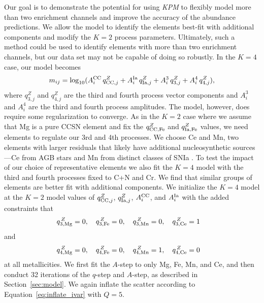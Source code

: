 \documentclass[modern, linenumbers]{aastex631}
\newcommand{\qcc}{q_{{\rm CC,}j}^{Z}}
\newcommand{\qccFe}{q_{{\rm CC, Fe}}^{Z}}
\newcommand{\qIa}{q_{{\rm Ia,}j}^{Z}}
\newcommand{\qIaFe}{q_{{\rm Ia,Fe}}^{Z}}
\newcommand{\Acc}{A^{\rm CC}_{i}}
\newcommand{\AIa}{A^{\rm Ia}_{i}}
\newcommand{\name}{\textsl{KPM}}
\begin{document}
Our goal is to demonstrate the potential for using \name{} to flexibly model more than two enrichment channels and improve the accuracy of the abundance predictions. We allow the model to identify the elements best-fit with additional components and modify the $K=2$ process parameters. Ultimately, such a method could be used to identify elements with more than two enrichment channels, but our data set may not be capable of doing so robustly. In the $K=4$ case, our model becomes
\begin{equation}\label{eq:mij_4}
    m_{ij} = \log_{10}(\Acc\,\qcc + \AIa\,\qIa + A_{i}^{3}\,q_{3, j}^{Z} + A_{i}^{4}\,q_{4, j}^{Z}),
\end{equation}
where $q_{3, j}^{Z}$ and $q_{4, j}^{Z}$ are the third and fourth process vector components and $ A_{i}^3$ and $A_{i}^4$ are the third and fourth process amplitudes. The model, however, does require some regularization to converge. As in the $K=2$ case where we assume that Mg is a pure CCSN element and fix the $\qccFe$ and $\qIaFe$ values, we need elements to regulate our 3rd and 4th processes. We choose Ce and Mn, two elements with larger residuals that likely have additional nucleosynthetic sources---Ce from AGB stars and Mn from distinct classes of SNIa \citep[e.g.][]{gallino1998, reyes2020, gronow2021}. To test the impact of our choice of representative elements we also fit the $K=4$ model with the third and fourth processes fixed to C+N and Cr. We find that similar groups of elements are better fit with additional components. We initialize the $K=4$ model at the $K=2$ model values of $\qcc$, $\qIa$, $\Acc$, and $\AIa$ with the added constraints that 
\begin{equation}\label{eq:q3_z}
    q_{{\rm 3, Mg}}^{\,Z} = 0, \quad 
    q_{{\rm 3, Fe}}^{\,Z} = 0,  \quad 
    q_{{\rm 3, Mn}}^{\,Z} = 0, \quad 
    q_{{\rm 3, Ce}}^{\,Z} = 1 \quad 
\end{equation}
and 
\begin{equation}\label{eq:q4_z}
    q_{{\rm 4, Mg}}^{\,Z} = 0, \quad 
    q_{{\rm 4, Fe}}^{\,Z} = 0,  \quad 
    q_{{\rm 4, Mn}}^{\,Z} = 1, \quad 
    q_{{\rm 4, Ce}}^{\,Z} = 0 \quad 
\end{equation}
at all metallicities. We first fit the $A$-step to only Mg, Fe, Mn, and Ce, and then conduct 32 iterations of the $q$-step and $A$-step, as described in Section~\ref{sec:model}. We again inflate the scatter according to Equation~\ref{eq:inflate_ivar} with $Q=5$. 
\end{document}

